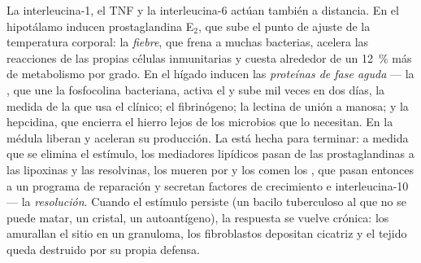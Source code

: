 \begin{proposition}\label{prop:b3:innate-immunity:systemic}
La interleucina-1, el TNF y la interleucina-6 actúan también a
distancia. En el hipotálamo inducen prostaglandina E$_{2}$, que sube el
punto de ajuste de la temperatura corporal: la \emph{fiebre}, que frena a
muchas bacterias, acelera las reacciones de las propias células
inmunitarias y cuesta alrededor de un \qty{12}{\%} más de metabolismo por
grado. En el hígado inducen las \emph{proteínas de fase aguda} --- la
, que une la fosfocolina bacteriana, activa el
 y sube mil veces en dos días, la medida de la  que
usa el clínico; el fibrinógeno; la lectina de unión a manosa; y la
hepcidina, que encierra el hierro lejos de los microbios que lo
necesitan. En la médula liberan  y aceleran su producción. La
 está hecha para terminar: a medida que se elimina el
estímulo, los mediadores lipídicos pasan de las prostaglandinas a las
lipoxinas y las resolvinas, los  mueren por  y los
comen los , que pasan entonces a un programa de reparación y
secretan factores de crecimiento e interleucina-10 --- la
\emph{resolución}. Cuando el estímulo persiste (un bacilo tuberculoso al
que no se puede matar, un cristal, un autoantígeno), la respuesta se
vuelve crónica: los  amurallan el sitio en un granuloma, los
fibroblastos depositan cicatriz y el tejido queda destruido por su propia
defensa.
\end{proposition}

